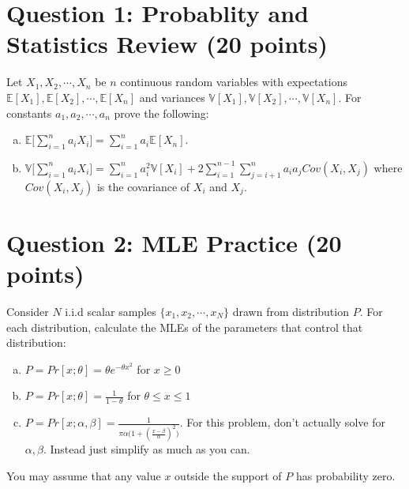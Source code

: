 \documentclass[11pt]{article}
\newcommand{\question}[1]{\section*{\normalsize #1}}
\begin{document}
\question{Question 1: Probablity and Statistics Review (20 points)}
Let $X_1, X_2, \cdots, X_n$ be $n$ continuous random variables with expectations $\mathbb{E}[X_1], \mathbb{E}[X_2], \cdots, \mathbb{E}[X_n]$ and variances $\mathbb{V}[X_1], \mathbb{V}[X_2],\cdots, \mathbb{V}[X_n]$. For constants $a_1,a_2,\cdots,a_n$ prove the following:
\begin{enumerate}[(a)]%
    \item $\mathbb{E}\Big[\sum\limits_{i=1}^n a_iX_i\Big] = \sum\limits_{i=1}^n a_i\mathbb{E}[X_n]$.
    \item $\mathbb{V}\Big[\sum\limits_{i=1}^n a_iX_i\Big] = \sum\limits_{i=1}^n a_i^2\mathbb{V}[X_i] + 2\sum\limits_{i=1}^{n-1}\sum\limits_{j=i+1}^n a_ia_jCov(X_i,X_j)$ where $Cov(X_i,X_j)$ is the covariance of $X_i$ and $X_j$.
\end{enumerate}\newpage















\question{Question 2: MLE Practice (20 points)}
Consider $N$ i.i.d scalar samples $\{x_1, x_2, \cdots, x_N\}$ drawn from distribution $P$. For each distribution, calculate the MLEs of the parameters that control that distribution:
\begin{enumerate}[(a)]%
    \item $P = Pr[x;\theta]=\theta e^{-\theta x^2}$ for $x\ge 0$
    \item $P = Pr[x;\theta]=\frac{1}{1-\theta}$ for $\theta\le x\le 1$
    \item $P = Pr[x;\alpha,\beta]=\frac{1}{\pi\alpha\Big(1+(\frac{x-\beta}{\alpha})^2\Big)}$. For this problem, don't actually solve for $\alpha,\beta$. Instead just simplify as much as you can.
\end{enumerate}
\noindent You may assume that any value $x$ outside the support of $P$ has probability zero.\newpage
\end{document}
